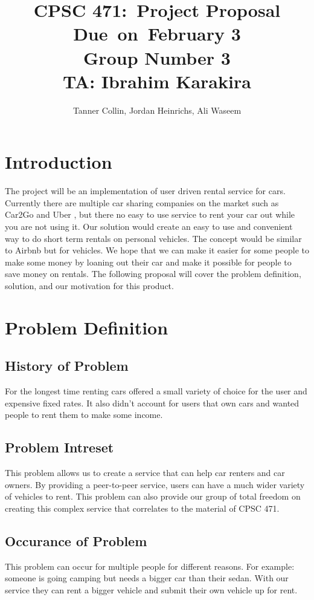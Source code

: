 \documentclass{article}
\title{
\vspace{2in}
\textmd{\textbf{CPSC 471:\ Project Proposal}}\\
\normalsize\vspace{0.1in}\small{Due\ on\ February 3 \\ Group Number 3 \\ TA: Ibrahim Karakira}\\
\vspace{3in}
}
\author{Tanner Collin, Jordan Heinrichs, Ali Waseem}
\date{}
\begin{document}
\maketitle
\newpage

\section{Introduction}
The project will be an implementation of user driven rental service for cars.
Currently there are multiple car sharing companies on the market such as Car2Go \cite{car2go}
and Uber \cite{uber}, but there no easy to use service to rent your car out while you are not using it.
Our solution would create an easy to use and convenient way to do short term rentals on personal vehicles. The concept would be similar to Airbnb \cite{airbnb} but for vehicles.
We hope that we can make it easier for some people to make some money by loaning out their car and make it possible for people to save money on rentals.
The following proposal will cover the problem definition, solution, and our motivation for this product.

\section{Problem Definition}
\subsection{History of Problem}
For the longest time renting cars offered a small variety of choice for the user and expensive fixed rates.
It also didn't account for users that own cars and wanted people to rent them to make some income.
\subsection{Problem Intreset}
This problem allows us to create a service that can help car renters and car owners. By providing a peer-to-peer service,
users can have a much wider variety of vehicles to rent. This problem can also provide our group of total freedom on creating
this complex service that correlates to the material of CPSC 471.
\subsection{Occurance of Problem}
This problem can occur for multiple people for different reasons. For example: someone is going camping but needs a bigger car
than their sedan. With our service they can rent a bigger vehicle and submit their own vehicle up for rent.
\end{document}
